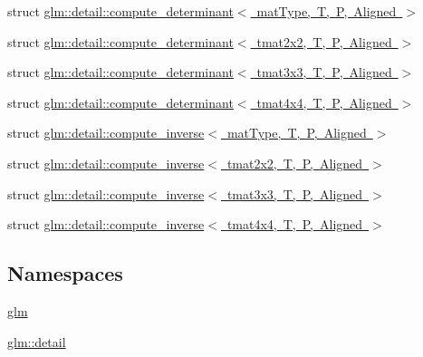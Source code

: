 \begin{DoxyCompactItemize}
struct \mbox{\hyperlink{structglm_1_1detail_1_1compute__determinant}{glm\+::detail\+::compute\+\_\+determinant$<$ mat\+Type, T, P, Aligned $>$}}
\item 
struct \mbox{\hyperlink{structglm_1_1detail_1_1compute__determinant_3_01tmat2x2_00_01_t_00_01_p_00_01_aligned_01_4}{glm\+::detail\+::compute\+\_\+determinant$<$ tmat2x2, T, P, Aligned $>$}}
\item 
struct \mbox{\hyperlink{structglm_1_1detail_1_1compute__determinant_3_01tmat3x3_00_01_t_00_01_p_00_01_aligned_01_4}{glm\+::detail\+::compute\+\_\+determinant$<$ tmat3x3, T, P, Aligned $>$}}
\item 
struct \mbox{\hyperlink{structglm_1_1detail_1_1compute__determinant_3_01tmat4x4_00_01_t_00_01_p_00_01_aligned_01_4}{glm\+::detail\+::compute\+\_\+determinant$<$ tmat4x4, T, P, Aligned $>$}}
\item 
struct \mbox{\hyperlink{structglm_1_1detail_1_1compute__inverse}{glm\+::detail\+::compute\+\_\+inverse$<$ mat\+Type, T, P, Aligned $>$}}
\item 
struct \mbox{\hyperlink{structglm_1_1detail_1_1compute__inverse_3_01tmat2x2_00_01_t_00_01_p_00_01_aligned_01_4}{glm\+::detail\+::compute\+\_\+inverse$<$ tmat2x2, T, P, Aligned $>$}}
\item 
struct \mbox{\hyperlink{structglm_1_1detail_1_1compute__inverse_3_01tmat3x3_00_01_t_00_01_p_00_01_aligned_01_4}{glm\+::detail\+::compute\+\_\+inverse$<$ tmat3x3, T, P, Aligned $>$}}
\item 
struct \mbox{\hyperlink{structglm_1_1detail_1_1compute__inverse_3_01tmat4x4_00_01_t_00_01_p_00_01_aligned_01_4}{glm\+::detail\+::compute\+\_\+inverse$<$ tmat4x4, T, P, Aligned $>$}}
\end{DoxyCompactItemize}
\subsection*{Namespaces}
\begin{DoxyCompactItemize}
\item 
 \mbox{\hyperlink{namespaceglm}{glm}}
\item 
 \mbox{\hyperlink{namespaceglm_1_1detail}{glm\+::detail}}
\end{DoxyCompactItemize}
